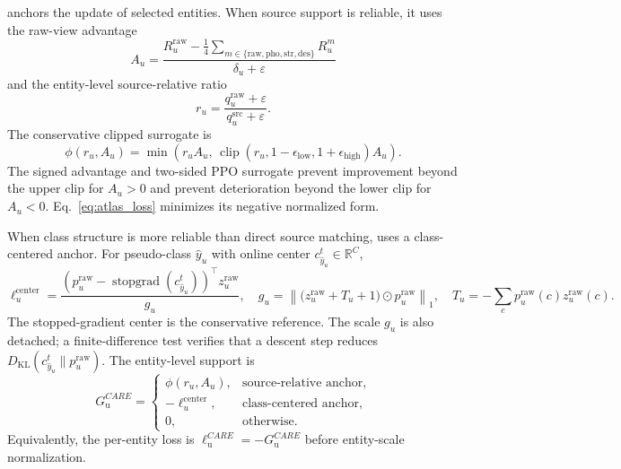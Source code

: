 \care{} anchors the update of selected entities. When source support is reliable, it uses the raw-view advantage
\begin{equation}
A_u
=
\frac{
R_u^{\mathrm{raw}}
-
\frac{1}{4}
\sum_{m\in\{\mathrm{raw},\mathrm{pho},\mathrm{str},\mathrm{des}\}}R_u^m
}
{\delta_u+\varepsilon}
\label{eq:advantage}
\end{equation}
and the entity-level source-relative ratio
\begin{equation}
r_u
=
\frac{q_u^{\mathrm{raw}}+\varepsilon}
{q_u^{\mathrm{src}}+\varepsilon}.
\label{eq:ratio}
\end{equation}
The conservative clipped surrogate is
\begin{equation}
\phi(r_u,A_u)
=
\min\!\left(
r_uA_u,\,
\operatorname{clip}(r_u,1-\epsilon_{\mathrm{low}},1+\epsilon_{\mathrm{high}})A_u
\right).
\label{eq:clip}
\end{equation}
The signed advantage and two-sided PPO surrogate prevent improvement beyond the
upper clip for $A_u>0$ and prevent deterioration beyond the lower clip for
$A_u<0$. Eq.~\ref{eq:atlas_loss} minimizes its negative normalized form.

When class structure is more reliable than direct source matching, \care{} uses a class-centered anchor. For pseudo-class $\hat y_u$ with online
center $c_{\hat y_u}^t\in\mathbb{R}^{C}$,
\begin{equation}
\ell_u^{\mathrm{center}}
=
\frac{(p_u^{\mathrm{raw}}-\operatorname{stopgrad}(c_{\hat y_u}^{t}))^\top
z_u^{\mathrm{raw}}}{g_u},
\quad
g_u=\left\|\bigl(z_u^{\mathrm{raw}}+T_u+1\bigr)\odot
p_u^{\mathrm{raw}}\right\|_1,
\quad
T_u=-\sum_c p_u^{\mathrm{raw}}(c)z_u^{\mathrm{raw}}(c).
\label{eq:centered}
\end{equation}
The stopped-gradient center is the conservative reference. The scale $g_u$ is
also detached; a finite-difference test verifies that a descent step reduces
$D_{\mathrm{KL}}(c_{\hat y_u}^{t}\|p_u^{\mathrm{raw}})$. The entity-level \care{} support is
\begin{equation}
G_{\mathrm{u}}^{CARE}
=
\begin{cases}
\phi(r_u,A_u),
& \text{source-relative anchor},\\[2pt]
-\ell_u^{\mathrm{center}},
& \text{class-centered anchor},\\[2pt]
0,
& \text{otherwise}.
\end{cases}
\label{eq:anc_entity}
\end{equation}
Equivalently, the per-entity loss is $\ell_{\mathrm{u}}^{CARE}=-G_{\mathrm{u}}^{CARE}$ before entity-scale normalization.

